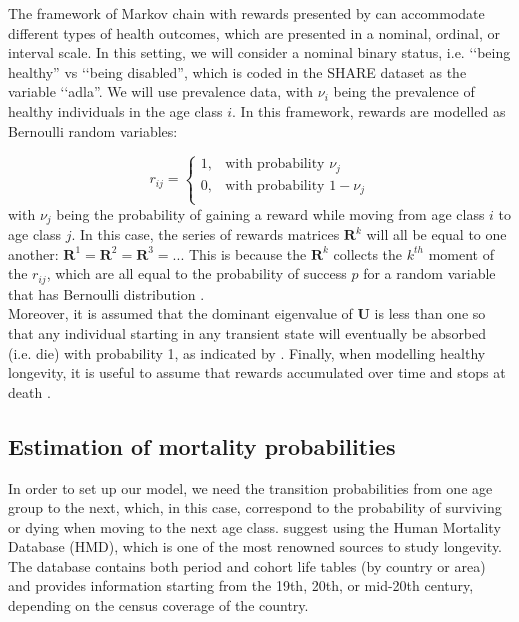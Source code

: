 The framework of Markov chain with rewards presented by \cite{Caswell2018} can accommodate different types of health outcomes, which are presented in a nominal, ordinal, or interval scale. In this setting, we will consider a nominal binary status, i.e. \lq\lq being healthy'' vs \lq\lq being disabled'', which is coded in the SHARE dataset as the variable \lq\lq adla''.
We will use prevalence data, with $\nu_i$ being the prevalence of healthy individuals in the age class $i$. In this framework, rewards are modelled as Bernoulli random variables:

\begin{equation}
  r_{ij} = \begin{cases}
        1, & \text{with probability } \nu_j\\
        0, & \text{with probability } 1-\nu_j\\
        \end{cases}
\end{equation}
with $\nu_j$ being the probability of gaining a reward while moving from age class $i$ to age class $j$. In this case, the series of rewards matrices $\mathbf{R}^k$ will all be equal to one another: $\mathbf{R}^1= \mathbf{R}^2 =\mathbf{R}^3 = ..$. This is because the $\mathbf{R}^k$ collects the $k^{th}$ moment of the $r_{ij}$, which are all equal to the probability of success $p$  for a random variable that has Bernoulli distribution \citep{forbes2011}. \\



Moreover, it is assumed that the dominant eigenvalue of $\mathbf{U}$ is less than one so that any individual starting in any transient state will eventually be absorbed (i.e. die) with probability 1, as indicated by \cite{Caswell2011}. Finally, when modelling healthy longevity, it is useful to assume that rewards accumulated over time and stops at death \citep{Caswell2018}.\\

\subsection{Estimation of mortality probabilities}


In order to set up our model, we need the transition probabilities from one age group to the next, which, in this case, correspond to the probability of surviving or dying when moving to the next age class. \cite{Caswell2018} suggest using the Human Mortality Database (HMD), which is one of the most renowned sources to study longevity.
The database contains both period and cohort life tables (by country or area) and provides information starting from the 19th, 20th, or mid-20th century, depending on the census coverage of the country. \\

